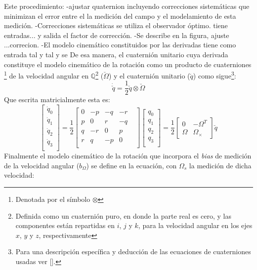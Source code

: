\documentclass[conference]{IEEEtran}
\begin{document}
Este procedimiento: 
-ajustar quaternion incluyendo correcciones sistemáticas que minimizan el error entre el la medición del campo y el modelamiento de esta medición.
-Correcciones sistemáticas se utiliza el observador óptimo. tiene entradas... y salida
el factor de corrección.
-Se describe en la figura, ajuste ...correcion.
-El modelo cinemático constituidos por las derivadas tiene como entrada tal y tal y se 
De esa manera, el cuaternión unitario cuya derivada constituye el modelo cinemático de la rotación como un producto de cuaterniones \footnote{Denotada por el símbolo $\otimes$} de la velocidad angular en $\mathbb{Q}$\footnote{Definida como un cuaternión puro, en donde la parte real es cero, y las componentes están repartidas en $i$, $j$ y $k$, para la velocidad angular en los ejes $x$, $y$ y $z$, respectivamente} ($\breve{\Omega}$) y el cuaternión unitario ($\breve{q}$) como sigue\footnote{ Para una descripción específica y deducción de las ecuaciones de cuaterniones usadas ver [\cite{Kuipers1999}].}:
\begin{equation}
\dot{\breve{q}}=\frac{1}{2}\breve{q}\otimes\breve{\Omega}
\end{equation}
Que escrita matricialmente \cite{Zhong2002} esta es:
\begin{equation}\label{modelo_ecc7}
\begin{bmatrix}\dot{q}_0\\\dot{q}_1\\\dot{q}_2\\\dot{q}_3\\ \end{bmatrix}= \frac{1}{2}\begin{bmatrix} 0&-p&-q&-r\\ p&0&r&-q\\ q&-r&0&p&\\ r& q&-p&0\\ \end{bmatrix} 
\begin{bmatrix} q_0\\q_1\\q_2\\q_3\\ \end{bmatrix}= \frac{1}{2}\begin{bmatrix} 0&-\Omega^T\\ \Omega&\Omega_\times \end{bmatrix}\breve{q}
\end{equation}
Finalmente el modelo cinemático de la rotación que incorpora el \emph{bias} de medición de la velocidad angular ($b_\Omega$) se define en la ecuación, con $\Omega_s$ la medición de dicha velocidad: 
\end{document}
